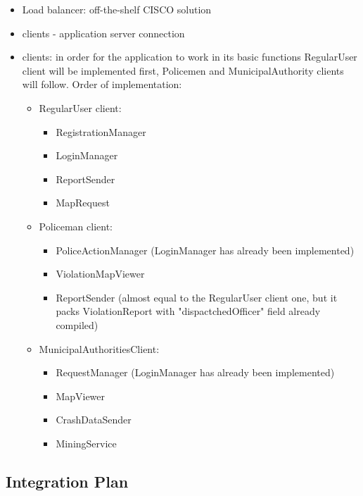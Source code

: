 \begin{itemize}
	\item Load balancer: off-the-shelf CISCO solution
	\item clients - application server connection
	\item clients: in order for the application to work in its basic functions RegularUser client will be implemented first, Policemen and MunicipalAuthority clients will follow.\newline
	Order of implementation:
		\begin{itemize}
			\item RegularUser client:
			\begin{itemize}
				\item RegistrationManager
				\item LoginManager
				\item ReportSender
				\item MapRequest
			\end{itemize}
			\newpage
			\item Policeman client:
			\begin{itemize}
				\item PoliceActionManager (LoginManager has already been implemented)
				\item ViolationMapViewer
				\item ReportSender (almost equal to the RegularUser client one, but it packs ViolationReport with "dispactchedOfficer" field already compiled)
			\end{itemize}
			\item MunicipalAuthoritiesClient:
				\begin{itemize}
					\item RequestManager (LoginManager has already been implemented)
					\item MapViewer
					\item CrashDataSender
					\item MiningService
				\end{itemize} 
			\end{itemize}
	\end{itemize} 

\subsection{Integration Plan}

